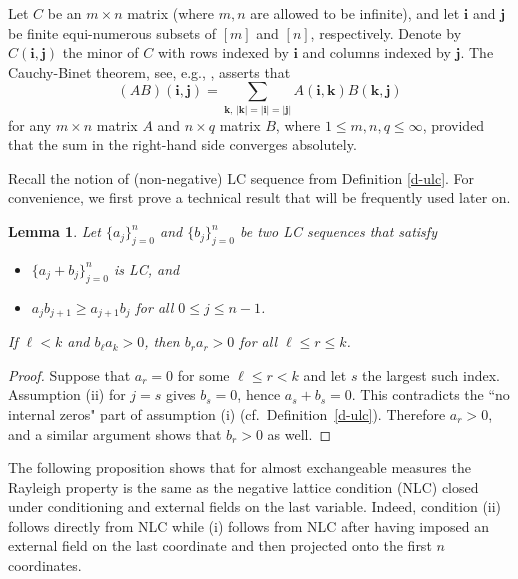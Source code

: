 \documentclass[10pt,reqno]{amsart}
\theoremstyle{plain}
\newtheorem{lemma}[theorem]{Lemma}
\theoremstyle{definition}
\theoremstyle{remark}
\newcommand{\LC}{\text{LC}}
\begin{document}
Let $C$ be an $m \times n$ matrix (where $m,n$ are allowed to be infinite), 
and let $\mathbf{i}$ and $\mathbf{j}$ be 
finite equi-numerous subsets of $[m]$ and $[n]$, respectively. Denote by 
$C(\mathbf{i}, \mathbf{j})$ the minor of $C$ with rows indexed by 
$\mathbf{i}$ and columns indexed by $\mathbf{j}$. The Cauchy-Binet theorem, 
see, e.g., \cite{Kar}, asserts that 
$$
(AB)(\mathbf{i}, \mathbf{j})
= \sum_{\mathbf{k},\,|\mathbf{k}|=|\mathbf{i}|=|\mathbf{j}|} A(\mathbf{i}, 
\mathbf{k})B(\mathbf{k}, \mathbf{j})
$$
for any $m\times n$ matrix $A$ and $n\times q$ matrix $B$, where
$1\le m,n,q\le \infty$, provided that the sum in the right-hand side converges
absolutely. 

Recall the notion of (non-negative) $\LC$ sequence from 
Definition \ref{d-ulc}. For convenience, we first prove a technical result 
that will be frequently used later on.

\begin{lemma}\label{l-tech}
Let $\{a_j\}_{j=0}^n$ and $\{b_j\}_{j=0}^n$ be two LC 
sequences that satisfy
\begin{itemize} 
\item[(i)] $\{a_j +  b_j\}_{j=0}^n$ is LC, and 
\item[(ii)] $a_jb_{j+1} \geq a_{j+1}b_j$ for all $0 \leq j \leq n-1$. 
\end{itemize}
If $\ell<k$ and $b_\ell a_k>0$, then $b_ra_r>0$ for all $\ell\leq r\leq k$.
\end{lemma}

\begin{proof}
Suppose that $a_r=0$ for
some $\ell \leq r< k$ and let $s$ the largest such index. Assumption (ii) 
for $j=s$ gives $b_s=0$, hence $a_s+b_s=0$. This contradicts the 
``no internal zeros" part of assumption (i) (cf.~Definition~\ref{d-ulc}). 
Therefore $a_r>0$, and a similar argument shows that $b_r>0$ as well. 
\end{proof}

The following proposition shows that for almost exchangeable measures the 
Rayleigh property is the same as the negative lattice condition (NLC) 
closed under conditioning and external fields on the last variable. 
Indeed, condition (ii) follows directly from 
NLC while (i) follows from NLC after having imposed an external field on the 
last coordinate and then projected onto the first $n$ coordinates. 
\end{document}
